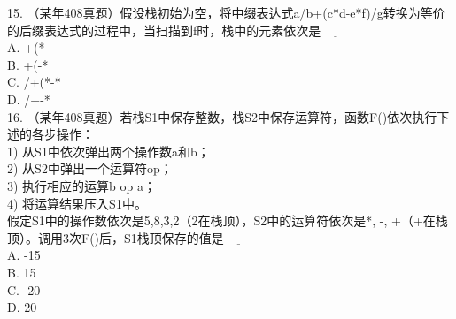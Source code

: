     15. （某年408真题）假设栈初始为空，将中缀表达式a/b+(c*d-e*f)/g转换为等价的后缀表达式的过程中，当扫描到f时，栈中的元素依次是$\underline{\hspace{1cm}}$\\
A. +(*-\\
B. +(-*\\
C. /+(*-*\\
D. /+-*\\

    16. （某年408真题）若栈S1中保存整数，栈S2中保存运算符，函数F()依次执行下述的各步操作：\\
    1) 从S1中依次弹出两个操作数a和b；\\
    2) 从S2中弹出一个运算符op；\\
    3) 执行相应的运算b op a；\\
    4) 将运算结果压入S1中。\\
    假定S1中的操作数依次是5,8,3,2（2在栈顶），S2中的运算符依次是*, -, +（+在栈顶）。调用3次F()后，S1栈顶保存的值是$\underline{\hspace{1cm}}$\\
    A. -15\\
    B. 15\\
    C. -20\\
    D. 20\\

